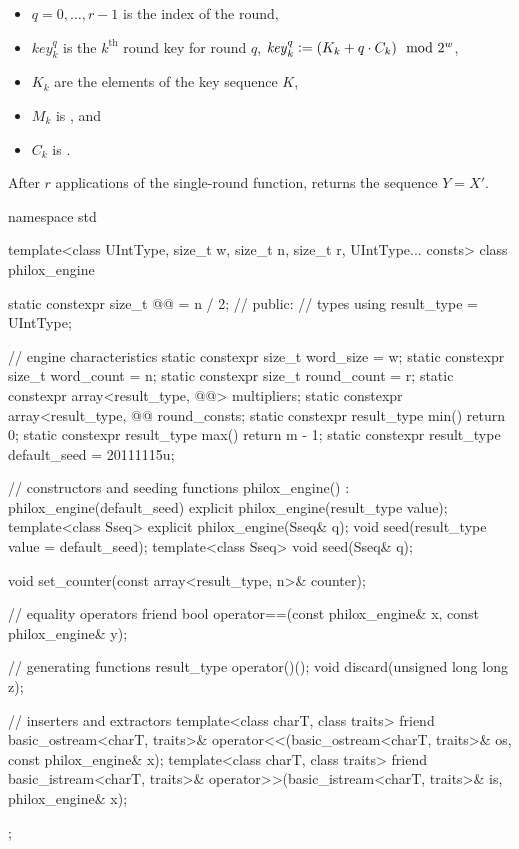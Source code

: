 \begin{itemize}
\begin{itemize}
  \item
  $q = 0, \dotsc, r - 1$ is the index of the round,

  \item
  $\mathit{key}^q_k$ is the $k^\text{th}$ round key for round $q$,
  $\mathit{key}^q_k \mathrel{\mathop:}= (K_k + q \cdot C_k) \mod 2^w$,

  \item
  $K_k$ are the elements of the key sequence $K$,

  \item
  $M_k$ is , and

  \item
  $C_k$ is .
  \end{itemize}
\end{itemize}

\pnum
After $r$ applications of the single-round function,
 returns the sequence $Y = X'$.

%
%
\begin{codeblock}
namespace std {
  template<class UIntType, size_t w, size_t n, size_t r, UIntType... consts>
  class philox_engine {
    static constexpr size_t @@ = n / 2;   // \expos
  public:
    // types
    using result_type = UIntType;

    // engine characteristics
    static constexpr size_t word_size = w;
    static constexpr size_t word_count = n;
    static constexpr size_t round_count = r;
    static constexpr array<result_type, @@> multipliers;
    static constexpr array<result_type, @@ round_consts;
    static constexpr result_type min() { return 0; }
    static constexpr result_type max() { return m - 1; }
    static constexpr result_type default_seed = 20111115u;

    // constructors and seeding functions
    philox_engine() : philox_engine(default_seed) {}
    explicit philox_engine(result_type value);
    template<class Sseq> explicit philox_engine(Sseq& q);
    void seed(result_type value = default_seed);
    template<class Sseq> void seed(Sseq& q);

    void set_counter(const array<result_type, n>& counter);

    // equality operators
    friend bool operator==(const philox_engine& x, const philox_engine& y);

    // generating functions
    result_type operator()();
    void discard(unsigned long long z);

    // inserters and extractors
    template<class charT, class traits>
      friend basic_ostream<charT, traits>&
        operator<<(basic_ostream<charT, traits>& os, const philox_engine& x);
    template<class charT, class traits>
      friend basic_istream<charT, traits>&
        operator>>(basic_istream<charT, traits>& is, philox_engine& x);
  };
}
\end{codeblock}

